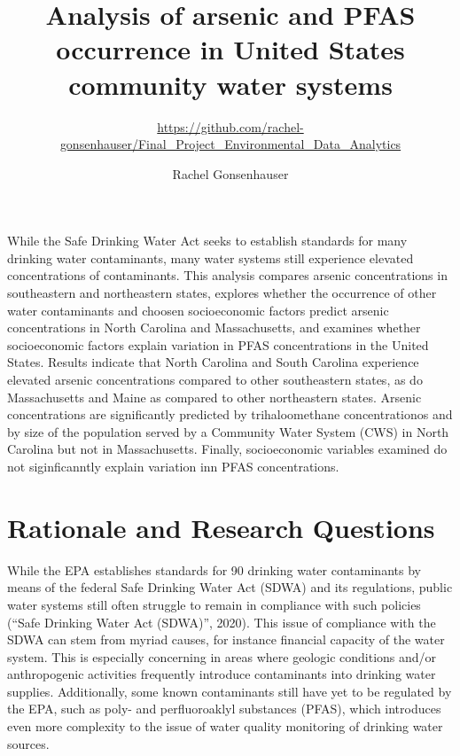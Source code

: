 \documentclass[12pt,]{article}
\title{Analysis of arsenic and PFAS occurrence in United States community water
systems}
\subtitle{\url{https://github.com/rachel-gonsenhauser/Final_Project_Environmental_Data_Analytics}}
\author{Rachel Gonsenhauser}
\date{}
\begin{document}
\maketitle

\newpage
\abstract

While the Safe Drinking Water Act seeks to establish standards for many
drinking water contaminants, many water systems still experience
elevated concentrations of contaminants. This analysis compares arsenic
concentrations in southeastern and northeastern states, explores whether
the occurrence of other water contaminants and choosen socioeconomic
factors predict arsenic concentrations in North Carolina and
Massachusetts, and examines whether socioeconomic factors explain
variation in PFAS concentrations in the United States. Results indicate
that North Carolina and South Carolina experience elevated arsenic
concentrations compared to other southeastern states, as do
Massachusetts and Maine as compared to other northeastern states.
Arsenic concentrations are significantly predicted by trihaloomethane
concentrationos and by size of the population served by a Community
Water System (CWS) in North Carolina but not in Massachusetts. Finally,
socioeconomic variables examined do not siginficanntly explain variation
inn PFAS concentrations.

\newpage
\tableofcontents 
\newpage
\listoftables 
\newpage
\listoffigures 
\newpage

\hypertarget{rationale-and-research-questions}{%
\section{Rationale and Research
Questions}\label{rationale-and-research-questions}}

While the EPA establishes standards for 90 drinking water contaminants
by means of the federal Safe Drinking Water Act (SDWA) and its
regulations, public water systems still often struggle to remain in
compliance with such policies (``Safe Drinking Water Act (SDWA)'',
2020). This issue of compliance with the SDWA can stem from myriad
causes, for instance financial capacity of the water system. This is
especially concerning in areas where geologic conditions and/or
anthropogenic activities frequently introduce contaminants into drinking
water supplies. Additionally, some known contaminants still have yet to
be regulated by the EPA, such as poly- and perfluoroaklyl substances
(PFAS), which introduces even more complexity to the issue of water
quality monitoring of drinking water sources.
\end{document}
